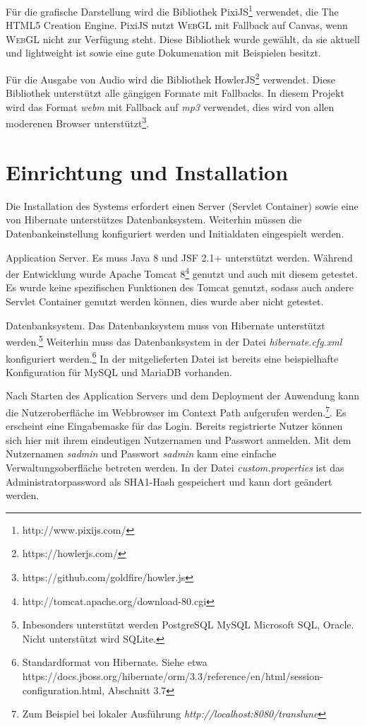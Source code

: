 \documentclass[ngerman,11pt]{report}
\begin{document}
Für die grafische Darstellung wird die Bibliothek PixiJS\footnote{http://www.pixijs.com/}
verwendet, die \glqq The HTML5 Creation Engine\grqq. PixiJS nutzt \textsc{WebGL} mit
Fallback auf Canvas, wenn \textsc{WebGL} nicht zur Verfügung steht. Diese Bibliothek
wurde gewählt, da sie aktuell und lightweight ist sowie  eine gute Dokumenation mit
Beispielen besitzt.

Für die Ausgabe von Audio wird die Bibliothek HowlerJS\footnote{https://howlerjs.com/}
verwendet. Diese Bibliothek unterstützt alle gängigen Formate mit Fallbacks. In
diesem Projekt wird das Format \textit{webm} mit Fallback auf \textit{mp3} verwendet, dies
wird von allen moderenen Browser unterstützt\footnote{https://github.com/goldfire/howler.js}.



\chapter{Einrichtung und Installation}

Die Installation des Systems erfordert einen Server (Servlet Container) sowie
eine von Hibernate unterstützes Datenbanksystem. Weiterhin müssen die Datenbankeinstellung
konfiguriert werden und Initialdaten eingespielt werden.

Application Server. Es muss Java 8 und JSF 2.1+ unterstützt werden. Während der Entwicklung wurde
Apache Tomcat 8\footnote{http://tomcat.apache.org/download-80.cgi} genutzt und auch mit diesem
getestet. Es wurde keine spezifischen Funktionen des Tomcat genutzt, sodass auch andere Servlet
Container genutzt werden können, dies wurde aber nicht getestet.

Datenbanksystem. Das Datenbanksystem muss von Hibernate unterstützt werden.\footnote{Inbesonders unterstützt werden PostgreSQL MySQL Microsoft SQL, Oracle. Nicht unterstützt wird SQLite.} Weiterhin muss das Datenbanksystem
in der Datei \textit{hibernate.cfg.xml} konfiguriert werden.\footnote{Standardformat von Hibernate. Siehe etwa https://docs.jboss.org/hibernate/orm/3.3/reference/en/html/session-configuration.html, Abschnitt 3.7} In der
mitgelieferten Datei ist bereits eine beispielhafte Konfiguration für MySQL und MariaDB vorhanden.

Nach Starten des Application Servers und dem Deployment der Anwendung kann die Nutzeroberfläche im Webbrowser
im Context Path aufgerufen werden.\footnote{Zum Beispiel bei lokaler Ausführung \textit{http://localhost:8080/translune}}. Es erscheint eine
Eingabemaske für das Login. Bereits registrierte Nutzer können sich hier mit ihrem eindeutigen Nutzernamen
und Passwort anmelden. Mit dem Nutzernamen \textit{sadmin} und Passwort \textit{sadmin} kann eine einfache
Verwaltungsoberfläche betreten werden. In der Datei \textit{custom.properties} ist das Administratorpassword
als SHA1-Hash gespeichert und kann dort geändert werden. 
\end{document}
